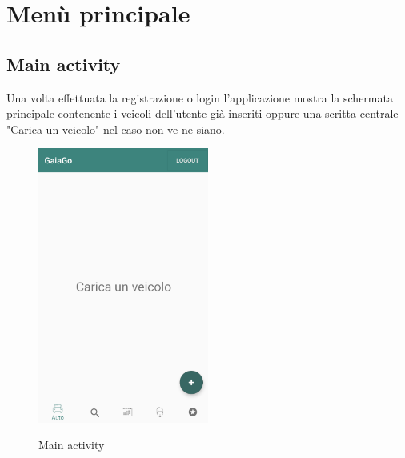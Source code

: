 \section{Menù principale}
\subsection{Main activity}
Una volta effettuata la registrazione o login l'applicazione mostra la schermata principale contenente i veicoli dell'utente già inseriti oppure una scritta centrale "Carica un veicolo" nel caso non ve ne siano.
 \begin{figure}[H] 
	\centering 
	\includegraphics[width=0.5\textwidth]{res/images/main_activity_vuota.png}\\
	\caption{Main activity}
	\label{Login}
\end{figure}
\pagebreak
